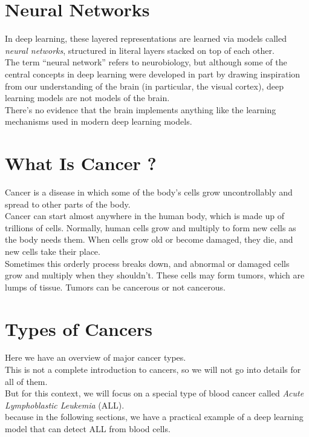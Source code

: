 \documentclass{SBCbookchapter}
\begin{document}
\section*{Neural Networks}
In deep learning, these layered representations 
are learned via models called \textit{neural networks}, 
structured in literal layers stacked on top of each other. \\
The term “neural network” refers to neurobiology, 
but although some of the central concepts in deep 
learning  were  developed  in  part  by  drawing  
inspiration  from  our  understanding  of the  
brain  (in  particular,  the  visual  cortex),  
deep  learning  models  are  not  models  of 
the brain. \\
There’s no evidence that the brain implements 
anything like the learning mechanisms used in 
modern deep learning models.

\section*{What Is Cancer ?}
Cancer is a disease in which some of the body’s 
cells grow uncontrollably and spread to other parts of the body. \\ 
Cancer can start almost anywhere in the human body, 
which is made up of trillions of cells. Normally, 
human cells grow and multiply to form new cells as the 
body needs them. When cells grow old or become 
damaged, they die, and new cells take their place. \\
Sometimes this orderly process breaks down, and
abnormal or damaged cells grow and multiply when
they shouldn’t. These cells may form tumors, which
are lumps of tissue. Tumors can be cancerous or
not cancerous. 

\section*{Types of Cancers}
Here we have an overview of major cancer types. \\
This is not a complete introduction to cancers, 
so we will not go into details for all of them. \\
But for this context, we will focus on a special type of blood cancer
called \textit{Acute Lymphoblastic Leukemia} (ALL). \\
because in the following sections, we have a practical example
of a deep learning model that can detect ALL from blood cells.
\end{document}
